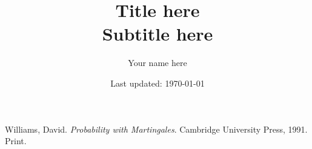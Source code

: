 \documentclass[letterpaper, 12pt]{article}
\newcommand{\1}{\mathds{1}}		%
\theoremstyle{definition}
\begin{document}

\title{Title here \\[1em]
\normalsize Subtitle here}


\author{\normalsize Your name here}
\date{\normalsize\vspace{-1ex} Last updated: \today}


\maketitle
\tableofcontents\label{sec:contents}






\begin{thebibliography}{1}

   Williams, David.
   \textit{Probability with Martingales}.
   Cambridge University Press, 1991.
   Print.


\end{thebibliography}

\end{document}
